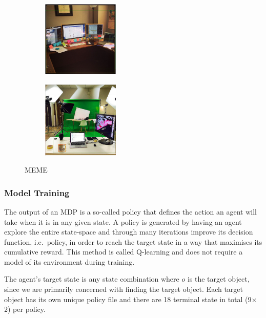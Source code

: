 \documentclass[a4paper, twoside]{article}
\begin{document}
\begin{figure}
  \centering
  \begin{subfigure}
    \centering
    \includegraphics[width=0.4\textwidth]{figures/desk_example.png}
  \end{subfigure}
  \begin{subfigure}
    \centering
    \includegraphics[width=0.4\textwidth]{figures/mug_example.png}
  \end{subfigure}
  \caption{MEME~\cite{openimages}}\label{fig:openimage-example}
\end{figure}

\subsubsection{Model Training}

\noindent The output of an MDP is a so-called policy that defines the action an agent will take when it is in any given state. A policy is generated by having an agent explore the entire state-space and through many iterations improve its decision function, i.e.\ policy, in order to reach the target state in a way that maximises its cumulative reward. This method is called Q-learning and does not require a model of its environment during training. 

The agent's target state is any state combination where $o$ is the target object, since we are primarily concerned with finding the target object. Each target object has its own unique policy file and there are 18 terminal state in total (9$\times$2) per policy.
\end{document}
